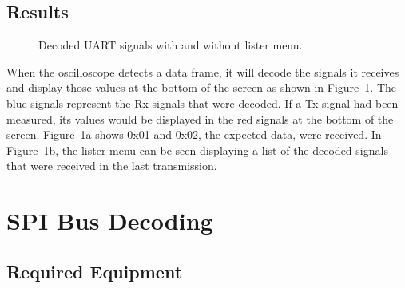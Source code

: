 \documentclass{article}
\begin{document}
  \subsection{Results}

  \begin{figure}[ht]
    \caption{Decoded UART signals with and without lister menu.}
    \label{fig:uart_bus}
  \end{figure}

  When the oscilloscope detects a data frame, it will decode the signals it
  receives and display those values at the bottom of the screen as shown in
  Figure~\ref{fig:uart_bus}. The blue signals represent the Rx signals that were
  decoded. If a Tx signal had been measured, its values would be displayed in
  the red signals at the bottom of the screen. Figure~\ref{fig:uart_bus}a shows
  0x01 and 0x02, the expected data, were received. In
  Figure~\ref{fig:uart_bus}b, the lister menu can be seen displaying a list of
  the decoded signals that were received in the last transmission.

  \section{SPI Bus Decoding}

  \subsection{Required Equipment}
\end{document}

